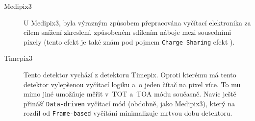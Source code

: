 \begin{description}
	\item[Medipix3] U Medipix3, byla výrazným způsobem přepracována vyčítací elektronika za cílem snížení zkreslení, způsobeném sdílením náboje mezi sousedními pixely (tento efekt je také znám pod pojmem \texttt{Charge Sharing} efekt \cite{Jakubek-radiography_and_charge_sharing}). 



	

	\item[Timepix3] Tento detektor vychází z detektoru Timepix. Oproti kterému má tento detektor vylepšenou vyčítací logiku a~o jeden čítač na pixel více. To mu mimo jiné umožňuje měřit v~TOT a~TOA módu současně. Navíc ještě přináší \texttt{Data-driven} vyčítací mód (obdobně, jako Medipix3), který na rozdíl od \texttt{Frame-based} vyčítání minimalizuje mrtvou dobu detektoru.

\end{description}

